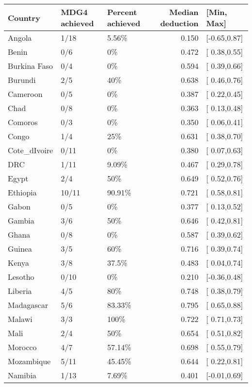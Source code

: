 \begin{table}[ht]
\centering
\begin{tabular}{lllrl}
  \hline
Country & MDG4 achieved & Percent achieved & Median deduction & [Min, Max] \\ 
  \hline
Angola & 1/18 & 5.56\% & 0.150 & [-0.65,0.87] \\ 
  Benin & 0/6 & 0\% & 0.472 & [ 0.38,0.55] \\ 
  Burkina Faso & 0/4 & 0\% & 0.594 & [ 0.39,0.66] \\ 
  Burundi & 2/5 & 40\% & 0.638 & [ 0.46,0.76] \\ 
  Cameroon & 0/5 & 0\% & 0.387 & [ 0.22,0.45] \\ 
  Chad & 0/8 & 0\% & 0.363 & [ 0.13,0.48] \\ 
  Comoros & 0/3 & 0\% & 0.350 & [ 0.06,0.41] \\ 
  Congo & 1/4 & 25\% & 0.631 & [ 0.38,0.70] \\ 
  Cote\_dIvoire & 0/11 & 0\% & 0.380 & [ 0.07,0.63] \\ 
  DRC & 1/11 & 9.09\% & 0.467 & [ 0.29,0.78] \\ 
  Egypt & 2/4 & 50\% & 0.649 & [ 0.52,0.76] \\ 
  Ethiopia & 10/11 & 90.91\% & 0.721 & [ 0.58,0.81] \\ 
  Gabon & 0/5 & 0\% & 0.377 & [ 0.13,0.52] \\ 
  Gambia & 3/6 & 50\% & 0.646 & [ 0.42,0.81] \\ 
  Ghana & 0/8 & 0\% & 0.587 & [ 0.39,0.62] \\ 
  Guinea & 3/5 & 60\% & 0.716 & [ 0.39,0.74] \\ 
  Kenya & 3/8 & 37.5\% & 0.483 & [ 0.04,0.74] \\ 
  Lesotho & 0/10 & 0\% & 0.210 & [-0.36,0.48] \\ 
  Liberia & 4/5 & 80\% & 0.748 & [ 0.38,0.79] \\ 
  Madagascar & 5/6 & 83.33\% & 0.795 & [ 0.65,0.88] \\ 
  Malawi & 3/3 & 100\% & 0.722 & [ 0.71,0.73] \\ 
  Mali & 2/4 & 50\% & 0.654 & [ 0.51,0.82] \\ 
  Morocco & 4/7 & 57.14\% & 0.698 & [ 0.55,0.79] \\ 
  Mozambique & 5/11 & 45.45\% & 0.644 & [ 0.22,0.81] \\ 
  Namibia & 1/13 & 7.69\% & 0.401 & [-0.01,0.69] \\ 

\end{tabular}
\end{table}
